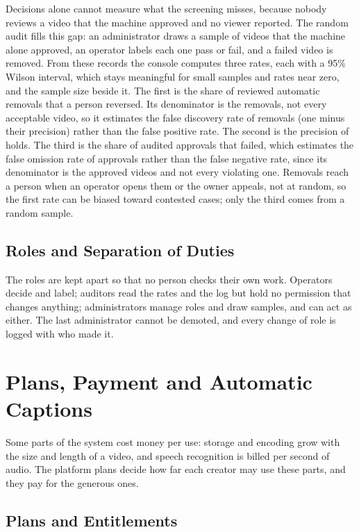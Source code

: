 Decisions alone cannot measure what the screening misses, because nobody reviews a video that the
machine approved and no viewer reported. The random audit fills this gap: an administrator draws a
sample of videos that the machine alone approved, an operator labels each one pass or fail, and a
failed video is removed. From these records the console computes three rates, each with a 95\%
Wilson interval, which stays meaningful for small samples and rates near zero, and the sample size
beside it. The first is the share of reviewed automatic removals that a person reversed. Its
denominator is the removals, not every acceptable video, so it estimates the false discovery rate of
removals (one minus their precision) rather than the false positive rate. The second is the
precision of holds. The third is the share of audited approvals that failed, which estimates the
false omission rate of approvals rather than the false negative rate, since its denominator is the
approved videos and not every violating one. Removals reach a person when an operator opens them or
the owner appeals, not at random, so the first rate can be biased toward contested cases; only the
third comes from a random sample.

\subsection{Roles and Separation of Duties}
\label{sec:roles-design}

The roles are kept apart so that no person checks their own work. Operators decide and label;
auditors read the rates and the log but hold no permission that changes anything; administrators
manage roles and draw samples, and can act as either. The last administrator cannot be demoted, and
every change of role is logged with who made it.

\section{Plans, Payment and Automatic Captions}
\label{sec:plans-design}

Some parts of the system cost money per use: storage and encoding grow with the size and length of
a video, and speech recognition is billed per second of audio. The platform plans decide how far each
creator may use these parts, and they pay for the generous ones.

\subsection{Plans and Entitlements}
\label{sec:entitlements}

